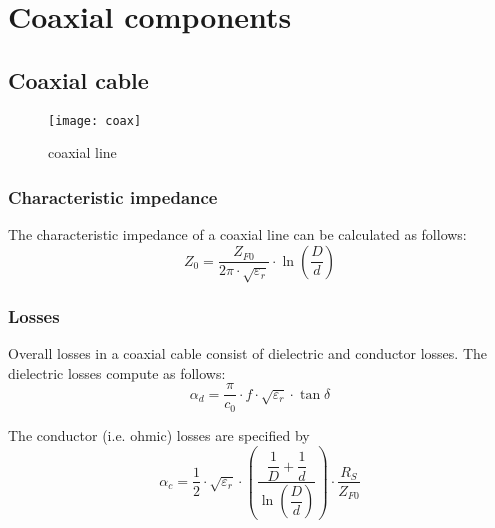 %
%
%
%

\chapter{Coaxial components}

\section{Coaxial cable}

\begin{figure}[ht]
\begin{center}
\texttt{[image: coax]}
\end{center}
\caption{coaxial line}
\label{fig:coax}
\end{figure}
\FloatBarrier

\subsection{Characteristic impedance}

The characteristic impedance of a coaxial line can be calculated as follows:
\begin{equation}
Z_0 = \dfrac{Z_{F0}}{2\pi\cdot\sqrt{\varepsilon_r}}\cdot\ln{\left(\dfrac{D}{d}\right)}
\end{equation}

\subsection{Losses}

Overall losses in a coaxial cable consist of dielectric and conductor
losses.  The dielectric losses compute as follows:
\begin{equation}
\alpha_d = \dfrac{\pi}{c_0}\cdot f\cdot \sqrt{\varepsilon_r} \cdot \tan{\delta}
\end{equation}

The conductor (i.e. ohmic) losses are specified by
\begin{equation}
\alpha_c = \dfrac{1}{2}\cdot \sqrt{\varepsilon_r} \cdot\left(\dfrac{\dfrac{1}{D} + \dfrac{1}{d}}{\ln{\left(\dfrac{D}{d}\right)}}\right)\cdot\dfrac{R_S}{Z_{F0}}
\end{equation}

